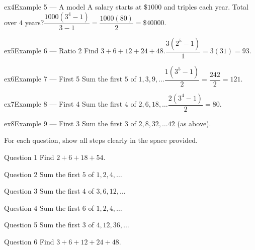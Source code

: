 \documentclass[11pt]{article}
\begin{document}
\begin{example}{ex4}{Example 5 --- A model}
A salary starts at $\$1000$ and triples each year. Total over $4$ years?\soln $\dfrac{1000(3^{4}-1)}{3-1}=\dfrac{1000(80)}{2}=\$40000$.
\end{example}

\begin{example}{ex5}{Example 6 --- Ratio 2}
Find $3+6+12+24+48$.\soln $\dfrac{3(2^{5}-1)}{1}=3(31)=93$.
\end{example}

\begin{example}{ex6}{Example 7 --- First 5}
Sum the first $5$ of $1,3,9,\dots$\soln $\dfrac{1(3^{5}-1)}{2}=\dfrac{242}{2}=121$.
\end{example}

\begin{example}{ex7}{Example 8 --- First 4}
Sum the first $4$ of $2,6,18,\dots$\soln $\dfrac{2(3^{4}-1)}{2}=80$.
\end{example}

\begin{example}{ex8}{Example 9 --- First 3}
Sum the first $3$ of $2,8,32,\dots$\soln $42$ (as above).
\end{example}

\clearpage
{}
For each question, show all steps clearly in the space provided.

\begin{qbox}{Question 1}
Find $2+6+18+54$.\workspace{2.4cm}
\end{qbox}

\begin{qbox}{Question 2}
Sum the first $5$ of $1,2,4,\dots$\workspace{2.4cm}
\end{qbox}

\begin{qbox}{Question 3}
Sum the first $4$ of $3,6,12,\dots$\workspace{2.4cm}
\end{qbox}

\begin{qbox}{Question 4}
Sum the first $6$ of $1,2,4,\dots$\workspace{2.4cm}
\end{qbox}

\begin{qbox}{Question 5}
Sum the first $3$ of $4,12,36,\dots$\workspace{2.4cm}
\end{qbox}

\begin{qbox}{Question 6}
Find $3+6+12+24+48$.\workspace{2.4cm}
\end{qbox}
\end{document}
